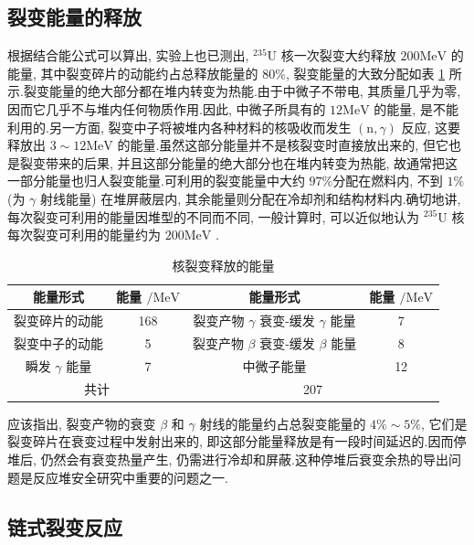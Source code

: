 \documentclass{Sichuan Normal University}
\begin{document}
\subsection{裂变能量的释放}

根据结合能公式可以算出, 实验上也已测出, ${ }^{235} \mathrm{U}$ 核一次裂变大约释放 $200 \mathrm{MeV}$ 的能量,
其中裂变碎片的动能约占总释放能量的 $80 \%$, 裂变能量的大致分配如表 \ref{tab:核裂变释放的能量} 所示.裂变能量的绝大部分都在堆内转变为热能.由于中微子不带电, 其质量几乎为零, 因而它几乎不与堆内任何物质作用.因此, 中微子所具有的 $12 \mathrm{MeV}$ 的能量, 是不能利用的.另一方面, 裂变中子将被堆内各种材料的核吸收而发生 $(\mathrm{n}, \gamma)$ 反应, 这要释放出 $3 \sim 12 \mathrm{MeV}$ 的能量.虽然这部分能量并不是核裂变时直接放出来的, 但它也是裂变带来的后果, 并且这部分能量的绝大部分也在堆内转变为热能, 故通常把这一部分能量也归人裂变能量.可利用的裂变能量中大约 $97 \%$分配在燃料内, 不到 $1 \%$ (为 $\gamma$ 射线能量) 在堆屏蔽层内, 其余能量则分配在冷却剂和结构材料内.确切地讲, 每次裂变可利用的能量因堆型的不同而不同, 一般计算时, 可以近似地认为 ${ }^{235} \mathrm{U}$ 核每次裂变可利用的能量约为 $200 \mathrm{MeV}$ .

\begin{table}[H]
    \caption{核裂变释放的能量}
    \label{tab:核裂变释放的能量}
    \centering
    \begin{tabular}{cc|cc}
        \toprule 
        能量形式 & 能量 $/ \mathrm{MeV}$ & 能量形式 & 能量 $/ \mathrm{MeV}$\\
        \midrule 
        裂变碎片的动能 & 168 & 裂变产物 $\gamma$ 衰变-缓发 $\gamma$ 能量 & 7\\
        裂变中子的动能 & 5 & 裂变产物 $\beta$ 衰变-缓发 $\beta$ 能量 & 8\\
        瞬发 $\gamma$ 能量 & 7 & 中微子能量 & 12\\
        \midrule
        \multicolumn{2}{c}{共计} & \multicolumn{2}{c}{207} \\
        \bottomrule
    \end{tabular}
\end{table}
    
应该指出, 裂变产物的衰变 $\beta$ 和 $\gamma$ 射线的能量约占总裂变能量的 $4 \% \sim 5 \%$, 它们是裂变碎片在衰变过程中发射出来的, 即这部分能量释放是有一段时间延迟的.因而停堆后, 仍然会有衰变热量产生, 仍需进行冷却和屏蔽.这种停堆后衰变余热的导出问题是反应堆安全研究中重要的问题之一.

\subsection{链式裂变反应}
\end{document}
